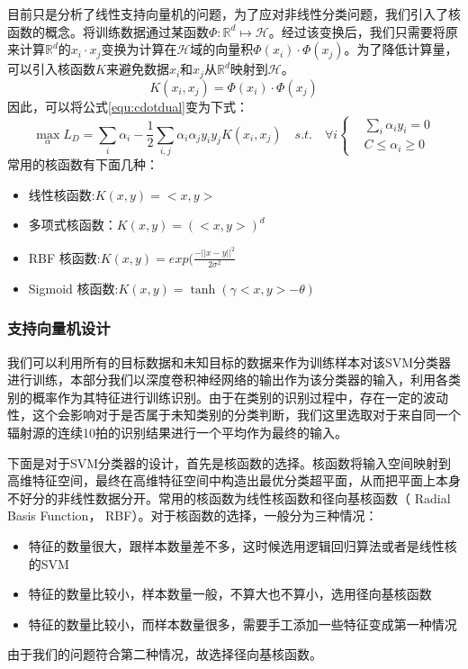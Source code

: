 目前只是分析了线性支持向量机的问题，为了应对非线性分类问题，我们引入了核函数的概念。将训练数据通过某函数$\Phi:\mathbb{R}^d\mapsto\mathcal{H}$。经过该变换后，我们只需要将原来计算$\mathbb{R}^d$的$x_i\cdot x_j$变换为计算在$\mathcal{H}$域的向量积$\Phi(x_i)\cdot\Phi(x_j)$。为了降低计算量，可以引入核函数$K$来避免数据$x_i$和$x_j$从$\mathbb{R}^d$映射到$\mathcal{H}$。
\begin{equation}
	K(x_i,x_j)=\Phi(x_i)\cdot\Phi(x_j)
\end{equation}
因此，可以将公式\ref{equ:cdotdual}变为下式：
\begin{equation}
	\max \limits_{\alpha} L_D=\sum_i{\alpha_i}-\frac{1}{2}\sum_{i,j}\alpha_i\alpha_jy_iy_j K(x_i,x_j)\quad s.t. \quad \forall i 
	\left\{
		\begin{aligned}
	   &\sum_i{\alpha_iy_i}=0  \\
	   &C \leq \alpha_i \geq 0
	   \end{aligned}
		\right.
\end{equation}
常用的核函数有下面几种：
\begin{itemize}
	\item 线性核函数:$K(x,y)=<x,y>$
	\item 多项式核函数：$K(x,y)=(<x,y>)^d$
	\item RBF 核函数:$K(x,y)=exp(\frac{-||x-y||^2}{2\sigma^2}$
	\item Sigmoid 核函数:$K(x,y)=\tanh(\gamma<x,y>-\theta)$
\end{itemize}
\subsubsection{支持向量机设计}
我们可以利用所有的目标数据和未知目标的数据来作为训练样本对该SVM分类器进行训练，本部分我们以深度卷积神经网络的输出作为该分类器的输入，利用各类别的概率作为其特征进行训练识别。由于在类别的识别过程中，存在一定的波动性，这个会影响对于是否属于未知类别的分类判断，我们这里选取对于来自同一个辐射源的连续10拍的识别结果进行一个平均作为最终的输入。

下面是对于SVM分类器的设计，首先是核函数的选择。核函数将输入空间映射到高维特征空间，最终在高维特征空间中构造出最优分类超平面，从而把平面上本身不好分的非线性数据分开。常用的核函数为线性核函数和径向基核函数（ Radial Basis Function， RBF）。对于核函数的选择，一般分为三种情况：
\begin{itemize}
	\item  特征的数量很大，跟样本数量差不多，这时候选用逻辑回归算法或者是线性核的SVM
	\item  特征的数量比较小，样本数量一般，不算大也不算小，选用径向基核函数
	\item  特征的数量比较小，而样本数量很多，需要手工添加一些特征变成第一种情况
\end{itemize}
由于我们的问题符合第二种情况，故选择径向基核函数。

